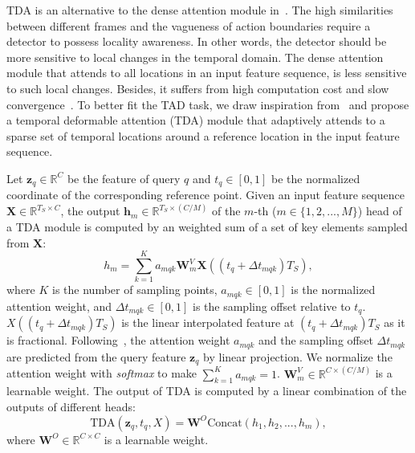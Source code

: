 \documentclass[lettersize,journal]{IEEEtran}
\def\R{\mathbb{R}}
\begin{document}
TDA is an alternative to the dense attention module in~\cite{vaswani2017attention}. The high similarities between different frames and the vagueness of action boundaries require a detector to possess locality awareness. In other words, the detector should be more sensitive to local changes in the temporal domain. The dense attention module that attends to all locations in an input feature sequence, is less sensitive to such local changes. Besides, it suffers from high computation cost and slow convergence~\cite{zhu2021deformable}. 
To better fit the TAD task, we draw inspiration from~\cite{zhu2021deformable} and propose a temporal deformable attention (TDA) module that adaptively attends to a sparse set of temporal locations around a reference location in the input feature sequence.

Let $\boldsymbol{z}_q \in \R ^{C}$ be the feature of query $q$ and $t_q \in [0, 1]$ be the  normalized coordinate of the corresponding reference point. Given an input feature sequence $\boldsymbol{X}\in \R^{T_S\times C}$, the output $\boldsymbol{h}_m \in \R ^ {T_S \times (C/M)}$ of the $m$-th ($m \in \{1, 2, ..., M\}$) head of a TDA module is computed by an weighted sum of a set of key elements sampled from $\boldsymbol{X}$:  
\begin{equation} 
\label{eq:deform_attention}
    h_m = \sum_{k=1}^K a_{mqk} \boldsymbol{W}^{V}_m \boldsymbol{X}((t_q+\Delta t_{mqk})T_S),
\end{equation}
where $K$ is the number of sampling points, $a_{mqk} \in [0, 1]$ is the normalized attention weight, and $\Delta t_{mqk} \in [0, 1]$ is the sampling offset relative to $t_q$. $X((t_q+\Delta t_{mqk})T_S)$ is the linear interpolated feature at $(t_q+\Delta t_{mqk})T_S$ as it is fractional.  Following~\cite{zhu2021deformable}, the attention weight $a_{mqk}$ and the sampling offset $\Delta t_{mqk}$ are predicted from the query feature $\boldsymbol{z}_q$ by linear projection. We normalize the attention weight with \textit{softmax} to make $\sum_{k=1}^K a_{mqk}=1$.  $\boldsymbol{W}^{V}_m \in \R ^{C\times (C/M)}$ is a learnable weight. The output of TDA is computed by a linear combination of the outputs of different heads:
\begin{equation}
\label{eq:head}
    \text{TDA}(\boldsymbol{z}_q, t_q, X) = \boldsymbol{W}^{O} \text{Concat}(h_1, h_2, ..., h_m),
\end{equation}
where $\boldsymbol{W}^{O} \in \R ^{C\times C}$ is a learnable weight.
\end{document}
